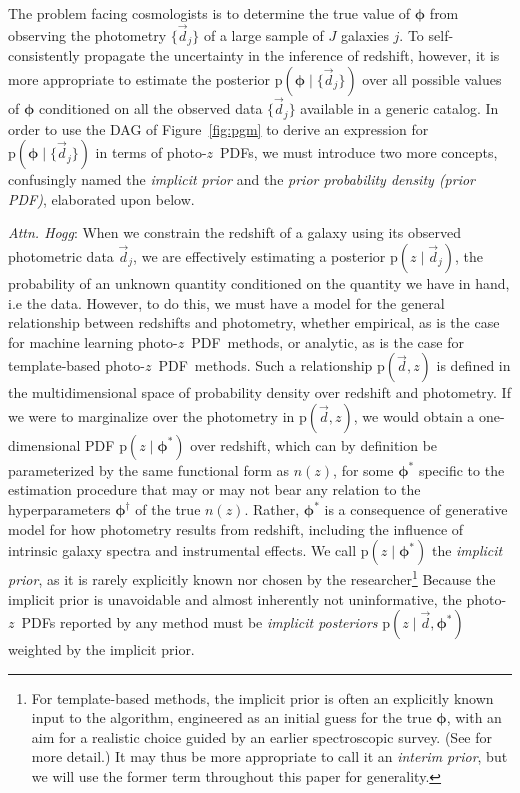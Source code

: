 \documentclass[iop]{emulateapj}
\newcommand{\todo}[3]{{\color{#2}\emph{#1}: #3}}
\newcommand{\dwh}[1]{\todo{Attn. Hogg}{blue}{#1}}
\newcommand{\Fig}[1]{Figure~\ref{#1}}
\newcommand{\data}{\ensuremath{\vec{d}}}%
\newcommand{\pr}[1]{\ensuremath{\mathrm{p}(#1)}}%
\newcommand{\gvn}{\mid}%
\newcommand{\pz}{photo-$z$}
\newcommand{\pzpdf}{\pz\ PDF}%
\newcommand{\nz}{$n(z)$}
\newcommand{\bvec}[1]{\ensuremath{\boldsymbol{#1}}}%
\newcommand{\ndphi}{\bvec{\phi}}
\begin{document}
The problem facing cosmologists is to determine the true value of $\ndphi$ from observing the photometry $\{\data_{j}\}$ of a large sample of $J$ galaxies $j$.
To self-consistently propagate the uncertainty in the inference of redshift, however, it is more appropriate to estimate the posterior $\pr{\ndphi \gvn \{\data_{j}\}}$ over all possible values of $\ndphi$ conditioned on all the observed data $\{\data_{j}\}$ available in a generic catalog.
In order to use the DAG of \Fig{fig:pgm} to derive an expression for $\pr{\ndphi \gvn \{\data_{j}\}}$ in terms of \pzpdf s, we must introduce two more concepts, confusingly named the \textit{implicit prior} and the \textit{prior probability density (prior PDF)}, elaborated upon below.

\dwh{When we constrain the redshift of a galaxy using its observed photometric data $\data_{j}$, we are effectively estimating a posterior $\pr{z \gvn \data_{j}}$, the probability of an unknown quantity conditioned on the quantity we have in hand, i.e the data.
However, to do this, we must have a model for the general relationship between redshifts and photometry, whether empirical, as is the case for machine learning \pzpdf\ methods, or analytic, as is the case for template-based \pzpdf\ methods.
Such a relationship $\pr{\data, z}$ is defined in the multidimensional space of probability density over redshift and photometry.
If we were to marginalize over the photometry in $\pr{\data, z}$, we would obtain a one-dimensional PDF $\pr{z \gvn \ndphi^{*}}$ over redshift, which can by definition be parameterized by the same functional form as \nz, for some $\ndphi^{*}$ specific to the estimation procedure that may or may not bear any relation to the hyperparameters $\ndphi^{\dagger}$ of the true \nz.
Rather, $\ndphi^{*}$ is a consequence of generative model for how photometry results from redshift, including the influence of intrinsic galaxy spectra and instrumental effects. 
We call $\pr{z \gvn \ndphi^{*}}$ the \textit{implicit prior}, as it is rarely explicitly known nor chosen by the researcher\footnote{For template-based methods, the implicit prior is often an explicitly known input to the algorithm, engineered as an initial guess for the true $\ndphi$, with an aim for a realistic choice guided by an earlier spectroscopic survey.  
(See \citet{benitez_bayesian_2000} for more detail.)
It may thus be more appropriate to call it an \textit{interim prior}, but we will use the former term throughout this paper for generality.}
Because the implicit prior is unavoidable and almost inherently not uninformative, the \pzpdf s reported by any method must be \textit{implicit posteriors} $\pr{z \gvn \data, \ndphi^{*}}$ weighted by the implicit prior.}
\end{document}
